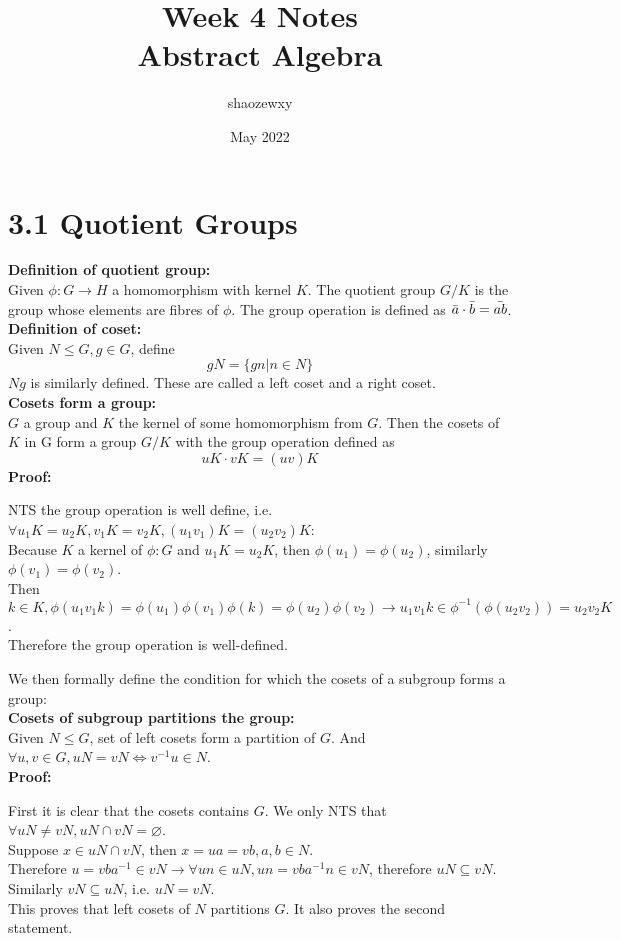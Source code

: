 \documentclass{article}
\title{Week 4 Notes\\
\large{Abstract Algebra}}
\author{shaozewxy }
\date{May 2022}
\begin{document}
\maketitle
\setcounter{secnumdepth}{0}
\section{3.1 Quotient Groups}
\textbf{Definition of quotient group:}\\
Given $\phi: G \rightarrow H$ a homomorphism with kernel $K$. The quotient group $G/K$ is the group whose elements are fibres of $\phi$. The group operation is defined as $\Bar{a} \cdot \Bar{b} = \Bar{ab}$.\\
\textbf{Definition of coset:}\\
Given $N \leq G, g \in G$, define
\begin{equation*}
    gN = \{gn|n \in N\}
\end{equation*}
$Ng$ is similarly defined. These are called a left coset and a right coset.\\
\textbf{Cosets form a group:}\\
$G$ a group and $K$ the kernel of some homomorphism from $G$. Then the cosets of $K$ in G form a group $G/K$ with the group operation defined as
\begin{equation*}
    uK \cdot vK = (uv)K
\end{equation*}
\textbf{Proof:}\\
\begin{addmargin}[1em]{0em}
NTS the group operation is well define, i.e. $\forall u_1K = u_2K, v_1K = v_2K, (u_1v_1)K = (u_2v_2)K$:\\
Because $K$ a kernel of $\phi: G$ and $u_1K = u_2K$, then $\phi(u_1) = \phi(u_2)$, similarly $\phi(v_1) = \phi(v_2)$.\\
Then $k \in K, \phi(u_1v_1k) = \phi(u_1)\phi(v_1)\phi(k) = \phi(u_2)\phi(v_2) \rightarrow u_1v_1k \in \phi^{-1}(\phi(u_2v_2)) = u_2v_2K$.\\
Therefore the group operation is well-defined.
\end{addmargin}
We then formally define the condition for which the cosets of a subgroup forms a group:\\
\textbf{Cosets of subgroup partitions the group:}\\
Given $N \leq G$, set of left cosets form a partition of $G$. And $\forall u, v \in G, uN = vN \iff v^{-1}u \in N$.\\
\textbf{Proof:}
\begin{addmargin}[1em]{0em}
First it is clear that the cosets contains $G$. We only NTS that $\forall uN \neq vN, uN \cap vN = \varnothing$.\\
Suppose $x \in uN \cap vN$, then $x = ua = vb, a, b \in N$.\\
Therefore $u = vba^{-1} \in vN \rightarrow \forall un \in uN, un = vba^{-1}n \in vN$, therefore $uN \subseteq vN$. Similarly $vN \subseteq uN$, i.e. $uN = vN$.\\
This proves that left cosets of $N$ partitions $G$. It also proves the second statement.
\end{addmargin}
\end{document}
